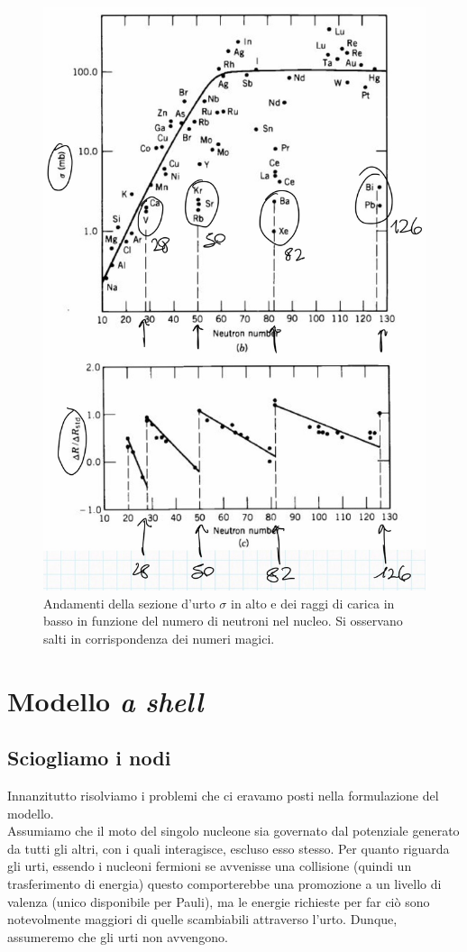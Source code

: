 \begin{figure}[!h]
    \centering
    \includegraphics[scale=0.3]{Immagini/mag-num2.png}
    \caption{Andamenti della sezione d'urto $\sigma$ in alto e dei raggi di carica in basso in funzione del numero di neutroni nel nucleo. Si osservano salti in corrispondenza dei numeri magici.}
    \label{sigmar}
\end{figure}
\newpage
\section{Modello \textit{a shell}}
\subsection{Sciogliamo i nodi} 
Innanzitutto risolviamo i problemi che ci eravamo posti nella formulazione del modello.\\
Assumiamo che il moto del singolo nucleone sia governato dal potenziale generato da tutti gli altri, con i quali interagisce, escluso esso stesso. Per quanto riguarda gli urti, essendo i nucleoni fermioni se avvenisse una collisione (quindi un trasferimento di energia) questo comporterebbe una promozione a un livello di valenza (unico disponibile per Pauli), ma le energie richieste per far ciò sono notevolmente maggiori di quelle scambiabili attraverso l'urto. Dunque, assumeremo che gli urti non avvengono.
